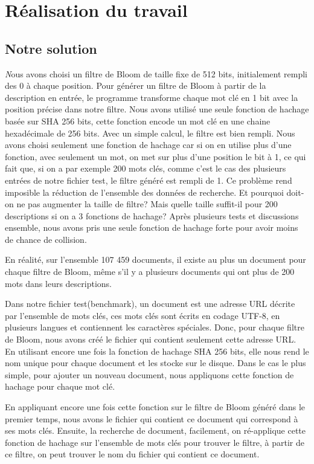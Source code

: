 \chapter{Réalisation du travail}
\section{Notre solution}
	{\huge \itshape N}ous avons choisi un filtre de Bloom de taille fixe de 512 bits, initialement rempli des 0 à chaque position. Pour générer un filtre de Bloom à partir de la description en entrée, le programme transforme chaque mot clé en 1 bit avec la position précise dans notre filtre. Nous avons utilisé une seule fonction de hachage basée sur SHA 256 bits, cette fonction encode un mot clé en une chaine hexadécimale de 256 bits. Avec un simple calcul, le filtre est bien rempli. Nous avons choisi seulement une fonction de hachage car si on en utilise plus d'une fonction, avec seulement un mot, on met sur plus d'une position le bit à 1, ce qui fait que, si on a par exemple 200 mots clés, comme c'est le cas des plusieurs entrées de notre fichier test, le filtre généré est rempli de 1. Ce problème rend imposible la réduction de l'ensemble des données de recherche. Et pourquoi doit-on ne pas augmenter la taille de filtre? Mais quelle taille suffit-il pour 200 descriptions si on a 3 fonctions de hachage? Après plusieurs tests et discussions ensemble, nous avons pris une seule fonction de hachage forte pour avoir moins de chance de collision. 
	
	En réalité, sur l'ensemble 107 459 documents, il existe au plus un document pour chaque filtre de Bloom, même s'il y a plusieurs documents qui ont plus de 200 mots dans leurs descriptions.
	
	Dans notre fichier test(benchmark), un document est une adresse URL décrite par l'ensemble de mots clés, ces mots clés sont écrits en codage UTF-8, en plusieurs langues et contiennent les caractères spéciales. Donc, pour chaque filtre de Bloom, nous avons créé le fichier qui contient seulement cette adresse URL. En utilisant encore une fois la fonction de hachage SHA 256 bits, elle nous rend le nom unique pour chaque document et les stocke sur le disque. Dans le cas le plus simple, pour ajouter un nouveau document, nous appliquons cette fonction de hachage pour chaque mot clé. 
	
	En appliquant encore une fois cette fonction sur le filtre de Bloom généré dans le premier temps, nous avons le fichier qui contient ce document qui correspond à ses mots clés. Ensuite, la recherche de document, facilement, on ré-applique cette fonction de hachage sur l'ensemble de mots clés pour trouver le filtre, à partir de ce filtre, on peut trouver le nom du fichier qui contient ce document. 
	
